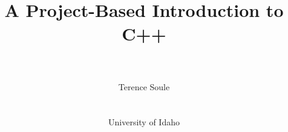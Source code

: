 \documentclass[11pt,openany]{book}
\title{A Project-Based Introduction to C++}
\date{}
\author{\\ \\ Terence Soule\\ \\ \\University of Idaho}
\begin{document}
\maketitle

\frontmatter

\tableofcontents

\newcommand{\codefont}[1]{\texttt{#1}}
\newcommand{\cf}[1]{\texttt{#1}}


\newif\ifcolor
\colortrue
\newcommand{\mycolor}{Mahogany}


\newcommand{\mysubsubsection}[1]{\vspace{-0.25cm}\subsubsection{#1}\vspace{-0.25cm}}

\newcommand{\mysubsection}[1]{\vspace{-0.25cm}\subsection{#1}\vspace{-0.25cm}}

\newcommand{\modification}[1]{\vspace{0.25cm}
{\noindent{\large\textbf{Mod \arabic{chapter}.\arabic{modNumber}: #1\\}}}}


\newcommand{\interlude}[1]{\newpage{\noindent{\LARGE\textbf{Interlude \arabic{interlude}: #1}}}
\addcontentsline{toc}{chapter}{Interlude \arabic{interlude}:  #1}\\\\}


\newenvironment{tight_itemize}{
\vspace{-0.2cm}
\begin{itemize} 
\setlength{\itemsep}{2pt} 
\setlength{\parskip}{0pt} 
\setlength{\parsep}{0pt} 
}{\end{itemize}}

\newenvironment{tight_enumerate}{
\vspace{-0.25cm}
\begin{enumerate} 
\setlength{\itemsep}{2pt} 
\setlength{\parskip}{0pt} 
\setlength{\parsep}{0pt} 
}{\end{enumerate}}
\end{document}
